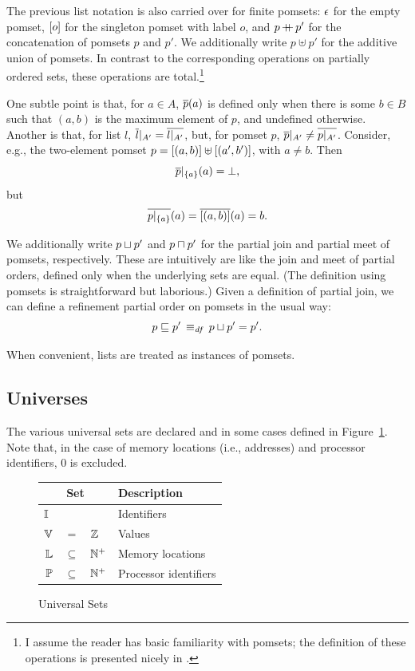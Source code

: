 \documentclass[11pt]{article}
\begin{document}
The previous list notation is also carried over for finite pomsets: $\epsilon$ for the empty pomset, $\left[o\right]$ for the singleton pomset with label $o$, and $p \operatorname{+\!\!\!+} p'$ for the concatenation of pomsets $p$ and $p'$. We additionally write $p \uplus p'$ for the additive union of pomsets. In contrast to the corresponding operations on partially ordered sets, these operations are total.\footnote{I assume the reader has basic familiarity with pomsets; the definition of these operations is presented nicely in \cite{DBLP:conf/icdt/GrumbachM95}.}

One subtle point is that, for $a \in A$, $\overline{p}(a)$ is defined only when there is some $b \in B$ such that $(a,b)$ is the maximum element of $p$, and undefined otherwise. Another is that, for list $l$, $\overline{l} |_{A'} = \overline{l |_{A'}}$, but, for pomset $p$, $\overline{p} |_{A'} \neq \overline{p |_{A'}}$. Consider, e.g., the two-element pomset $p = \left[(a,b)\right] \uplus \left[(a',b')\right]$, with $a \neq b$. Then \[\overline{p} |_{\left\lbrace a \right\rbrace}(a) = \bot,\] but \[\overline{p |_{\left\lbrace a \right\rbrace}}(a) = \overline{\left[(a,b)\right]}(a) = b.\] 

We additionally write $p \sqcup p'$ and $p \sqcap p'$ for the partial join and partial meet of pomsets, respectively. These are intuitively are like the join and meet of partial orders, defined only when the underlying sets are equal. (The definition using pomsets is straightforward but laborious.) Given a definition of partial join, we can define a refinement partial order on pomsets in the usual way: \[ p \sqsubseteq p' \operatorname{\;\equiv_{\mathit{df}}\;} p \sqcup p' = p'. \] 

When convenient, lists are treated as instances of pomsets. 

\subsection{Universes}

The various universal sets are declared and in some cases defined in Figure~\ref{fig:universes}. Note that, in the case of memory locations (i.e., addresses) and processor identifiers, 0 is excluded. 

\begin{figure}[ht]
	\centering
	\begin{tabular}{rcl|l}
		\multicolumn{3}{c}{Set} & Description \\ \hline
		\multicolumn{3}{l|}{$\mathbb{I}$} & Identifiers \\
		$\mathbb{V}$ & $=$ &  $\mathbb{Z}$ & Values \\
		$\mathbb{L}$ & $\subseteq$  &  $\mathbb{N}^+$ & Memory locations \\
		$\mathbb{P}$ &$\subseteq$ &  $\mathbb{N}^+$ & Processor identifiers
	\end{tabular}
	\caption{\label{fig:universes}Universal Sets}
\end{figure}
\end{document}
